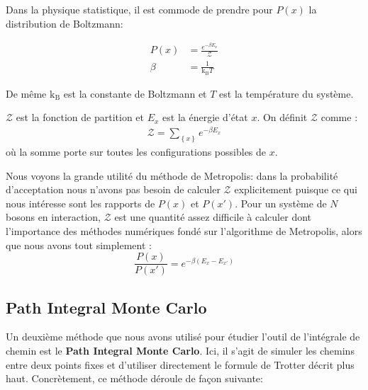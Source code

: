 \documentclass[11pt]{article}
\theoremstyle{definition}
\theoremstyle{remark}
\begin{document}
Dans la physique statistique, il est commode de prendre pour $P(x)$ la distribution de Boltzmann: 

\begin{align} 
\label{boltzmann_dist}
P(x) &= \frac{e^{-\beta E_x}}{\mathcal{Z}} \\
\beta &= \frac{1}{\mathrm{k_B}T}
\end{align}


De même $\mathrm{k_B}$ est la constante de Boltzmann et $T$ est la température du système. 

$\mathcal{Z}$ est la fonction de partition et $E_x$ est la énergie d'état $x$. 
On définit $\mathcal{Z}$ comme : 
\begin{align}
\label{partition}
\mathcal{Z}=\sum_{\left\lbrace x \right\rbrace} e^{-\beta E_x}
\end{align}
où la somme porte sur toutes les configurations possibles de $x$.

 Nous voyons la grande utilité du méthode de Metropolis: dans la probabilité d'acceptation nous n'avons pas besoin de calculer $\mathcal{Z}$ explicitement puisque ce qui nous intéresse sont les rapports de $P(x)$ et $P(x')$. Pour un système de $N$ bosons en interaction, $\mathcal{Z}$ est une quantité assez difficile à calculer dont l'importance des méthodes numériques fondé sur l'algorithme de Metropolis, alors que nous avons tout simplement :
\begin{equation}
 	\frac{P(x)}{P(x')}=e^{-\beta (E_x-E_{x'})}
\end{equation}


\subsection{Path Integral Monte Carlo}

Un deuxième méthode que nous avons utilisé pour étudier l'outil de l’intégrale de chemin est le \textbf{Path Integral Monte Carlo}. Ici, il s'agit de simuler les chemins entre deux points fixes et d'utiliser directement le formule de Trotter décrit plus haut. Concrètement, ce méthode déroule de façon suivante: 
\end{document}
